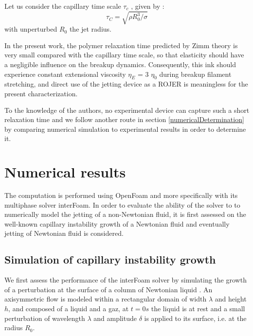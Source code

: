 \documentclass[twocolumn,10pt]{asme2ej}
\begin{document}
Let us consider the capillary time scale $\tau_c$ , given by :
\begin{equation}
    \tau_C= \sqrt{\rho R_0^3 / \sigma}
\end{equation}
with unperturbed $R_0$ the jet radius. 

In the present work, the polymer relaxation time predicted by Zimm theory is very small compared with the capillary time scale, so that elasticity should have a negligible influence on the breakup dynamics. Consequently, this ink should experience constant extensional viscosity $\eta_E$ = 3 $\eta_0$ during breakup filament stretching, and direct use of the jetting device as a ROJER \cite{keshavarz2015studying} is meaningless for the present characterization. 

To the knowledge of the authors, no experimental device can capture such a short relaxation time and we follow another route in section \ref{numericalDetermination} by comparing numerical simulation to experimental results in order to determine it.

\section{Numerical results}
The computation is performed using OpenFoam and more specifically with its multiphase solver interFoam. In order to evaluate the ability of the solver to to numerically model the jetting of a non-Newtonian fluid, it is first assessed on the well-known capillary instability growth of a Newtonian fluid and eventually jetting of Newtonian fluid is considered.

\subsection{Simulation of capillary instability growth}
We first assess the performance of the interFoam solver by simulating the growth of a perturbation at the surface of a column of Newtonian liquid \cite{delteil2011numerical,cervone2010simulation,deshpande2012evaluating}. 
An axisymmetric flow is modeled within a rectangular domain of width $\lambda$ and height $h$, and composed of a liquid and a gaz, at $t = 0s$ the liquid is at rest and a small perturbation of wavelength $\lambda$ and amplitude $\delta$ is applied to its surface, i.e. at the radius $R_0$. 
\end{document}
